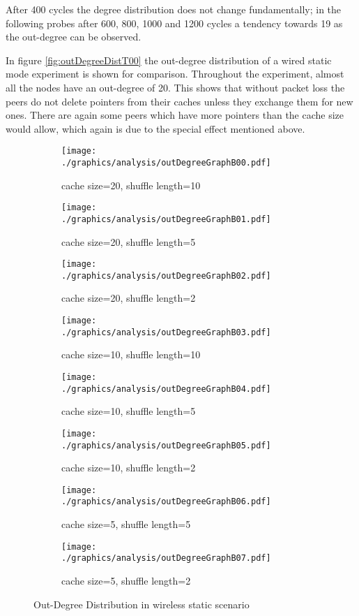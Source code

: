 After 400 cycles the degree distribution does not change fundamentally; in the
following probes after 600, 800, 1000 and 1200 cycles a tendency towards 19 as
the out-degree can be observed.

In figure \ref{fig:outDegreeDistT00} the out-degree distribution of a wired
static mode experiment is shown for comparison. Throughout the experiment,
almost all the nodes have an out-degree of 20. This shows that without packet
loss the peers do not delete pointers from their caches unless they exchange
them for new ones. There are again some peers which have more pointers than the
cache size would allow, which again is due to the special effect mentioned
above.

\begin{figure}
\begin{subfigure}{.5\textwidth}
	\texttt{[image: ./graphics/analysis/outDegreeGraphB00.pdf]}
	\caption{cache size=20, shuffle
	length=10}
	\label{fig:outDegreeDistB00small}
\end{subfigure}%
\begin{subfigure}{.5\textwidth}
	\texttt{[image: ./graphics/analysis/outDegreeGraphB01.pdf]}
	\caption{cache size=20, shuffle
	length=5}
	\label{fig:outDegreeDistB01small}
\end{subfigure}
\begin{subfigure}{.5\textwidth}
	\texttt{[image: ./graphics/analysis/outDegreeGraphB02.pdf]} \caption{cache size=20, shuffle length=2}
	\label{fig:outDegreeDistB02small}
\end{subfigure}%
\begin{subfigure}{.5\textwidth}
	\texttt{[image: ./graphics/analysis/outDegreeGraphB03.pdf]}
	\caption{cache size=10, shuffle
	length=10}
	\label{fig:outDegreeDistB03small}
\end{subfigure}
\begin{subfigure}{.5\textwidth}
	\texttt{[image: ./graphics/analysis/outDegreeGraphB04.pdf]}
	\caption{cache size=10, shuffle
	length=5}
	\label{fig:outDegreeDistB04small}
\end{subfigure}%
\begin{subfigure}{.5\textwidth}
	\texttt{[image: ./graphics/analysis/outDegreeGraphB05.pdf]}
	\caption{cache size=10, shuffle
	length=2}
	\label{fig:outDegreeDistB05small}
\end{subfigure}
\begin{subfigure}{.5\textwidth}
	\texttt{[image: ./graphics/analysis/outDegreeGraphB06.pdf]}
	\caption{cache size=5, shuffle
	length=5}
	\label{fig:outDegreeDistB06small}
\end{subfigure}%
\begin{subfigure}{.5\textwidth}
	\texttt{[image: ./graphics/analysis/outDegreeGraphB07.pdf]}
	\caption{cache size=5, shuffle
	length=2}
	\label{fig:outDegreeDistB07small}
\end{subfigure}
\caption{Out-Degree Distribution in wireless static scenario}
\end{figure}


